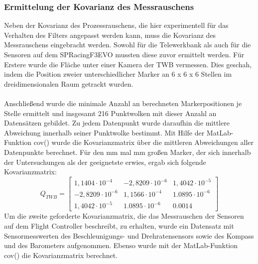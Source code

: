 \subsubsection{Ermittelung der Kovarianz des Messrauschens}
Neben der Kovarianz des Prozessrauschens, die hier experimentell für das Verhalten des Filters angepasst werden kann, muss die Kovarianz des Messrauschens eingebracht werden. Sowohl für die Telewerkbank als auch für die Sensoren auf dem SPRacingF3EVO mussten diese zuvor ermittelt werden. Für Erstere wurde die Fläche unter einer Kamera der TWB vermessen. Dies geschah, indem die Position zweier unterschiedlicher Marker an 6 x 6 x 6 Stellen im dreidimensionalen Raum getrackt wurden.\\\\
Anschließend wurde die minimale Anzahl an berechneten Markerpositionen je Stelle ermittelt und insgesamt 216 Punktwolken mit dieser Anzahl an Datensätzen gebildet. Zu jedem Datenpunkt wurde daraufhin die mittlere Abweichung innerhalb seiner Punktwolke bestimmt. Mit Hilfe der MatLab-Funktion \textsf{cov()} wurde die Kovarianzmatrix über die mittleren Abweichungen aller Datenpunkte berechnet. Für den \unit[99]{mm} mal \unit[99]{mm} großen Marker, der sich innerhalb der Untersuchungen als der geeignetste erwies, ergab sich folgende Kovarianzmatrix:
\begin{equation}
Q_{TWB} = \begin{bmatrix}
1,1404 \cdot 10^{-4} & -2,8209 \cdot 10^{-6} & 1,4042 \cdot 10^{-5} \\
-2,8209 \cdot 10^{-6} & 1,1566 \cdot 10^{-4} & 1.0895 \cdot 10^{-6} \\
1,4042 \cdot 10^{-5} & 1.0895 \cdot 10^{-6} & 0.0014
\end{bmatrix}
\end{equation} 
Um die zweite geforderte Kovarianzmatrix, die das Messrauschen der Sensoren auf dem Flight Controller beschreibt, zu erhalten, wurde ein Datensatz mit Sensormesswerten des Beschleunigungs- und Drehratensensors sowie des Kompass und des Barometers aufgenommen. Ebenso wurde mit der MatLab-Funktion \textsf{cov()} die Kovarianzmatrix berechnet.
